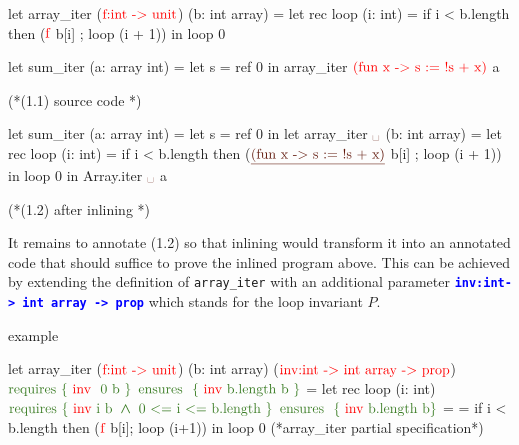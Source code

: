 \documentclass[a4paper,11pt,oneside]{article}
\theoremstyle{plain}
\newcommand{\bwedge}{\boldsymbol{~\wedge~}}
\begin{document}
\begin{adjustwidth}{-1em}{-2em}
\begin{footnotesize}
\begin{minipage}[t]{0.3\linewidth}
	\begin{whycode}  
   let array_iter ($\textcolor{red}{\text{f:int -> unit}}$) (b: int array)   
   = let rec loop (i: int) =  
       if i < b.length 
       then ($\textcolor{red}{\text{f}}$ b[i] ; loop (i + 1)) 
     in loop 0
   
   let sum_iter (a: array int) =		 
     let s = ref 0 in
     array_iter $\textcolor{red}{\text{(fun x -> s := !s + x)}}$ a  
     
  (*(1.1) source code *)   
 	\end{whycode}
 	\end{minipage}\hfill\vline
 \begin{minipage}[t]{0.45\linewidth} 

	\begin{whycode}  
   let sum_iter (a: array int) =		
     let s = ref 0 in
     let array_iter $\textcolor{Sepia}{\text{\textvisiblespace}}$ (b: int array)   
     = let rec loop (i: int) =  
         if i < b.length then
         ($\textcolor{Sepia}{\text{\underline{(fun x -> s := !s + x)}}}$ b[i] ; 
         loop (i + 1)) 
       in loop 0   
     in Array.iter $\textcolor{Sepia}{\text{\textvisiblespace}}$ a   
     
    (*(1.2) after inlining *)
 	\end{whycode}
 	\end{minipage}
 \end{footnotesize}
\end{adjustwidth}

It remains to annotate (1.2) so that inlining would transform it into an annotated code that should suffice to prove the inlined program above. 
This can be achieved by extending the definition of \texttt{array\_iter} with an additional parameter \textcolor{blue}{\texttt{\textbf{inv:int-> int array -> prop}}} which stands for the loop invariant $P$. 
\begin{small}\hypertarget{sum-iter}{example}
\begin{whycode}  
   let array_iter ($\textcolor{red}{\text{f:int -> unit}}$) (b: int array) ($\textcolor{red}{\text{inv:int -> int array -> prop}}$)    
     $\textcolor{OliveGreen}{\text{requires \{ \textcolor{red}{\text{inv }} 0~b \}}}$
     $\textcolor{OliveGreen}{\text{ensures~~}\{ \text{ \textcolor{red}{inv} b.length~b }\}}$  
   = let rec loop (i: int)
       $\textcolor{OliveGreen}{ \text{requires \{~\textcolor{red}{inv} i b} \bwedge \text{0 <= i <= b.length}~\}}$
       $\textcolor{OliveGreen}{\text{ensures~~}\{ \text{ \textcolor{red}{inv} b.length~b}\}}$ =    
       = if i < b.length then ($\textcolor{red}{\text{f}}$ b[i]; loop (i+1)) 
     in loop 0       
                                          (*array_iter partial specification*)
\end{whycode}
\end{small}
\end{document}
